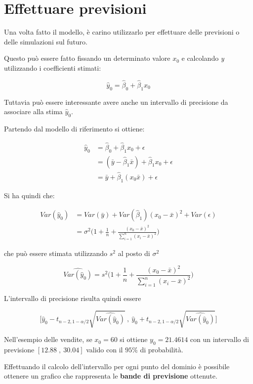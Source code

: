 \section{Effettuare previsioni}\label{effettuare-previsioni}

Una volta fatto il modello, è carino utilizzarlo per effettuare delle
previsioni o delle simulazioni sul futuro.

Questo può essere fatto fissando un determinato valore $ x_0 $ e calcolando \textit{y} utilizzando i coefficienti stimati:

$$
\hat{y}_0 = \hat{\beta}_0 + \hat{\beta}_1 x_0
$$

Tuttavia può essere interessante avere anche un intervallo di precisione da associare alla stima $ \hat{y}_0 $.

Partendo dal modello di riferimento si ottiene:

\begin{align*}
	\hat{y}_0 &= \hat{\beta}_0 + \hat{\beta}_1 x_0 + \epsilon \\
					&= (\bar{y} - \hat{\beta}_1 \bar{x}) + \hat{\beta}_1 x_0 + \epsilon \\
					&= \bar{y} + \hat{\beta}_1(x_0 \bar{x}) + \epsilon 
\end{align*}

Si ha quindi che:

\begin{align*}
	Var(\hat{y}_0) &= Var(\bar{y}) + Var(\hat{\beta}_1)(x_0 - \bar{x})^2 + Var(\epsilon) \\
	                         &= \sigma^2 \Bigg( 1 + \frac{1}{n} + \frac{(x_0 - \bar{x})^2}{\sum_{i=1}^{n} (x_i - \bar{x})^2 }\Bigg)
\end{align*}

che può essere stimata utilizzando $ s^2 $ al posto di $ \sigma^2 $

$$
\widehat{Var(\hat{y}_0)} = s^2 \Bigg( 1 + \frac{1}{n} + \frac{(x_0 - \bar{x})^2}{\sum_{i=1}^{n} (x_i - \bar{x})^2} \Bigg)
$$

L'intervallo di precisione risulta quindi essere

$$
\Bigg[ \hat{y}_0 - t_{n-2, 1-\alpha/2}\sqrt{\widehat{Var(\hat{y}_0)}} \:, \:\hat{y}_0 + t_{n-2, 1-\alpha/2}\sqrt{\widehat{Var(\hat{y}_0)}}\Bigg]
$$

Nell'esempio delle vendite, se $ x_0 = 60 $ si ottiene $ y_0 = 21.4614 $ con un intervallo di previsione $ [12.88 \; , \: 30.04] $ valido con il $ 95\% $ di probabilità.

Effettuando il calcolo dell'intervallo per ogni punto del dominio è possibile ottenere un grafico che rappresenta le \textbf{bande di previsione} ottenute.

